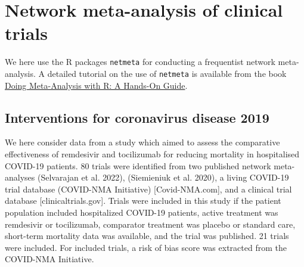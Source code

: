 \documentclass[
  letterpaper,
  DIV=11,
  numbers=noendperiod]{scrreprt}
\begin{document}
\hypertarget{network-meta-analysis-of-clinical-trials}{%
\section{Network meta-analysis of clinical
trials}\label{network-meta-analysis-of-clinical-trials}}

We here use the R packages \texttt{netmeta} for conducting a frequentist
network meta-analysis. A detailed tutorial on the use of
\texttt{netmeta} is available from the book
\href{https://bookdown.org/MathiasHarrer/Doing_Meta_Analysis_in_R/}{Doing
Meta-Analysis with R: A Hands-On Guide}.

\hypertarget{interventions-for-coronavirus-disease-2019}{%
\subsection{Interventions for coronavirus disease
2019}\label{interventions-for-coronavirus-disease-2019}}

We here consider data from a study which aimed to assess the comparative
effectiveness of remdesivir and tocilizumab for reducing mortality in
hospitalised COVID-19 patients. 80 trials were identified from two
published network meta-analyses (Selvarajan et al. 2022), (Siemieniuk et
al. 2020), a living COVID-19 trial database (COVID-NMA Initiative)
{[}Covid-NMA.com{]}, and a clinical trial database
{[}clinicaltrials.gov{]}. Trials were included in this study if the
patient population included hospitalized COVID-19 patients, active
treatment was remdesivir or tocilizumab, comparator treatment was
placebo or standard care, short-term mortality data was available, and
the trial was published. 21 trials were included. For included trials, a
risk of bias score was extracted from the COVID-NMA Initiative.
\end{document}
